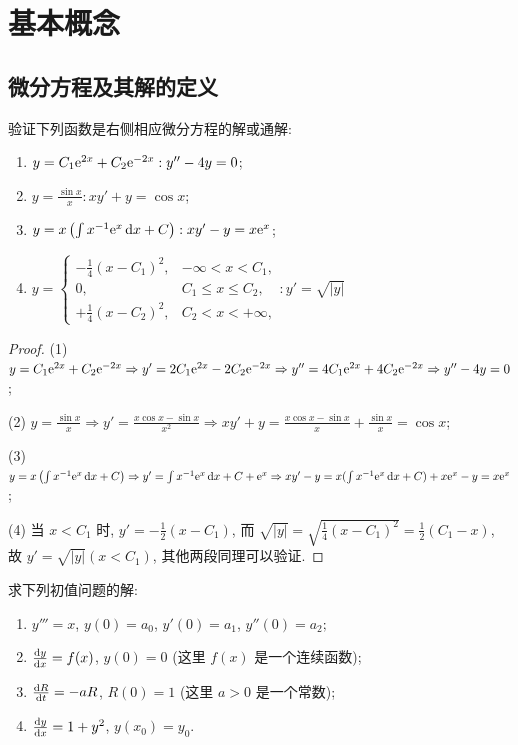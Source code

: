 \chapter{基本概念}



\section{微分方程及其解的定义}



\begin{exercise}
  验证下列函数是右侧相应微分方程的解或通解:
  \begin{enumerate}[(1)]
  \item $y=C_1\mathrm{e}^{2x}+C_2\mathrm{e}^{-2x}:y''-4y=0$;
  \item $\displaystyle y=\frac{\sin x}{x}:xy'+y=\cos x$;
  \item $y=x\left(\int x^{-1}\mathrm{e}^x\mathop{}\!\mathrm{d} x+C\right):xy'-y=x\mathrm{e}^x$;
  \item $y=\begin{cases}-\frac{1}{4}(x-C_1)^2,&-\infty<x<C_1,\\0,&C_1\leq x\leq C_2,\\+\frac{1}{4}(x-C_2)^2,&C_2<x<+\infty,\end{cases}:y'=\sqrt{|y|}$
  \end{enumerate}
\end{exercise}

\begin{proof}
  (1) $y=C_1\mathrm{e}^{2x}+C_2\mathrm{e}^{-2x}\Rightarrow y'=2C_1\mathrm{e}^{2x}-2C_2\mathrm{e}^{-2x}\Rightarrow y''=4C_1\mathrm{e}^{2x}+4C_2\mathrm{e}^{-2x}\Rightarrow y''-4y=0$;

  (2) $y=\frac{\sin x}{x}\Rightarrow y'=\frac{x\cos x-\sin x}{x^2}\Rightarrow xy'+y=\frac{x\cos x-\sin x}{x}+\frac{\sin x}{x}=\cos x$;

  (3) $y=x\left(\int x^{-1}\mathrm{e}^x\mathop{}\!\mathrm{d} x+C\right)\Rightarrow y'=\int x^{-1}\mathrm{e}^x\mathop{}\!\mathrm{d} x+C+\mathrm{e}^x\Rightarrow xy'-y=x(\int x^{-1}\mathrm{e}^x\mathop{}\!\mathrm{d} x+C)+x\mathrm{e}^x-y=x\mathrm{e}^x$;

  (4) 当 $x<C_1$ 时, $y'=-\frac{1}{2}(x-C_1)$,
  而 $\sqrt{|y|}=\sqrt{\frac{1}{4}(x-C_1)^2}=\frac{1}{2}(C_1-x)$,
  故 $y'=\sqrt{|y|}(x<C_1)$, 其他两段同理可以验证.
\end{proof}



\begin{exercise}
  求下列初值问题的解:
  \begin{enumerate}[(1)]
  \item $y'''=x$, $y(0)=a_0$, $y'(0)=a_1$, $y''(0)=a_2;$
  \item $\frac{\mathop{}\!\mathrm{d} y}{\mathop{}\!\mathrm{d} x}=f(x)$, $y(0)=0$ (这里 $f(x)$ 是一个连续函数);
  \item $\frac{\mathop{}\!\mathrm{d} R}{\mathop{}\!\mathrm{d} t}=-aR$, $R(0)=1$ (这里 $a>0$ 是一个常数);
  \item $\frac{\mathop{}\!\mathrm{d} y}{\mathop{}\!\mathrm{d} x}=1+y^2$, $y(x_0)=y_0$.
  \end{enumerate}
\end{exercise}


